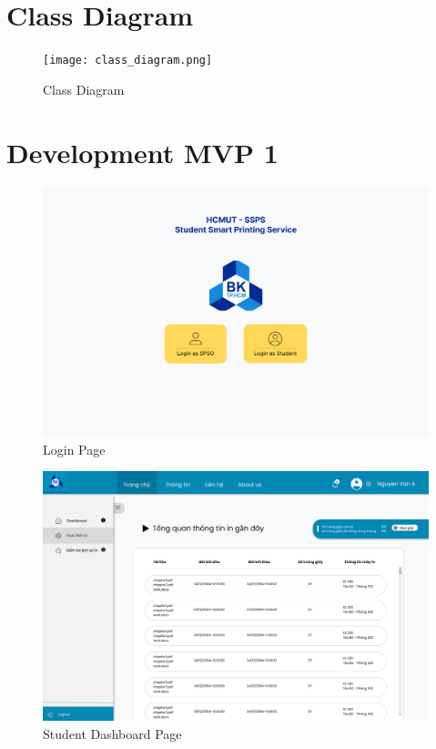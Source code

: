 \documentclass[a4paper]{report}
\begin{document}
\section{Class Diagram}
\newpage
\thispagestyle{empty}
\begin{landscape} %
    
    \begin{figure}[H]
        \centering
        \texttt{[image: class\_diagram.png]}
            \caption{Class Diagram}
        \label{fig:class_diagram}
    \end{figure}    
    
\end{landscape} %

\newpage
\section{Development MVP 1}

\begin{figure}[H]
    \centering
    \includegraphics[width = 1\textwidth, ]{images/UI/Login Page.png}
    \caption{Login Page}
\end{figure}  

\begin{figure}[H]
    \centering
    \includegraphics[width = 1\textwidth, ]{images/UI/Bảng điều khiển sinh viên.png}
    \caption{Student Dashboard Page}
\end{figure}  
\end{document}
